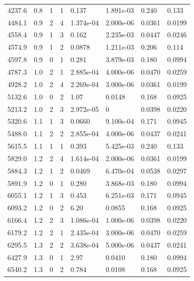 \documentclass[preview]{standalone}
\begin{document}
{{{\begin{tabular}{L{1.2cm}C{1.2cm} C{0.3cm}C{0.5cm} C{1.4cm}C{1.4cm} C{1.4cm}C{1.4cm}}
  4237.6  &   0.8  & 1     &  1 &  0.137  & 1.891e-03  & 0.240 &  0.133   \\ 
  4484.1  &   0.9  & 2     &  4 &  1.374e-04  & 2.000e-06  & 0.0361 &  0.0199   \\ 
  4558.4  &   0.9  & 1     &  3 &  0.162  & 2.235e-03  & 0.0447 &  0.0246   \\ 
  4574.9  &   0.9  & 1     &  2 &  0.0878  & 1.211e-03  & 0.206 &  0.114   \\ 
  4597.8  &   0.9  & 0     &  1 &  0.281  & 3.879e-03  & 0.180 &  0.0994   \\ 
  4787.3  &   1.0  & 2     &  1 &  2.885e-04  & 4.000e-06  & 0.0470 &  0.0259   \\ 
  4928.2  &   1.0  & 2     &  4 &  2.269e-04  & 3.000e-06  & 0.0361 &  0.0199   \\ 
  5132.6  &   1.0  & 0     &  2 &  1.07  & 0.0148  & 0.168 &  0.0925   \\ 
  5213.2  &   1.0  & 2     &  3 &  2.972e-05  & 0  & 0.0398 &  0.0220   \\ 
  5320.6  &   1.1  & 1     &  3 &  0.0660  & 9.100e-04  & 0.171 &  0.0945   \\ 
  5488.0  &   1.1  & 2     &  2 &  2.855e-04  & 4.000e-06  & 0.0437 &  0.0241   \\ 
  5615.5  &   1.1  & 1     &  1 &  0.393  & 5.425e-03  & 0.240 &  0.133   \\ 
  5829.0  &   1.2  & 2     &  4 &  1.614e-04  & 2.000e-06  & 0.0361 &  0.0199   \\ 
  5884.3  &   1.2  & 1     &  2 &  0.0469  & 6.470e-04  & 0.0538 &  0.0297   \\ 
  5891.9  &   1.2  & 0     &  1 &  0.280  & 3.868e-03  & 0.180 &  0.0994   \\ 
  6055.1  &   1.2  & 1     &  3 &  0.453  & 6.251e-03  & 0.171 &  0.0945   \\ 
  6093.2  &   1.2  & 0     &  2 &  6.20  & 0.0855  & 0.168 &  0.0925   \\ 
  6166.4  &   1.2  & 2     &  3 &  1.086e-04  & 1.000e-06  & 0.0398 &  0.0220   \\ 
  6179.2  &   1.2  & 2     &  1 &  2.435e-04  & 3.000e-06  & 0.0470 &  0.0259   \\ 
  6295.5  &   1.3  & 2     &  2 &  3.638e-04  & 5.000e-06  & 0.0437 &  0.0241   \\ 
  6427.9  &   1.3  & 0     &  1 &  2.97  & 0.0410  & 0.180 &  0.0994   \\ 
  6540.2  &   1.3  & 0     &  2 &  0.784  & 0.0108  & 0.168 &  0.0925   \\ 

\end{tabular}}}}
\end{document}
